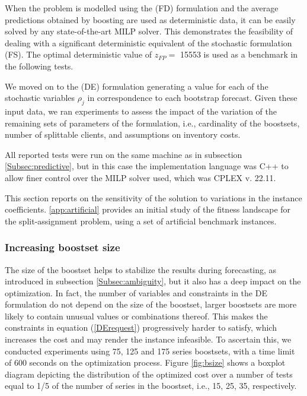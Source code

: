 \documentclass{itor}
\begin{document}
When the problem is modelled using the (FD) formulation and the average predictions obtained by boosting are used as deterministic data, it can be easily solved by any state-of-the-art MILP solver. This demonstrates the feasibility of dealing with a significant deterministic equivalent of the stochastic formulation (FS). The optimal deterministic value of $z_{FP} =$ 15553 is used as a benchmark in the following tests.

We moved on to the (DE) formulation generating a value for each of the stochastic variables $\rho_j$ in correspondence to each bootstrap forecast.
Given these input data, we ran experiments to assess the impact of the variation of the remaining sets of parameters of the formulation, i.e., cardinality of the boostsets, number of splittable clients, and assumptions on inventory costs. 

All reported tests were run on the same machine as in subsection \ref{Subsec:predictive}, but in this case the implementation language was C++ to allow finer control over the MILP solver used, which was CPLEX v. 22.11.

This section reports on the sensitivity of the solution to variations in the instance coefficients. \ref{app:artificial} provides an initial study of the fitness landscape for the split-assignment problem, using a set of artificial benchmark instances.

\subsubsection*{Increasing boostset size}

The size of the boostset helps to stabilize the results during forecasting, as introduced in subsection \ref{Subsec:ambiguity}, but it also has a deep impact on the optimization. In fact, the number of variables and constraints in the DE formulation do not depend on the size of the boostset, larger boostsets are more likely to contain unusual values or combinations thereof. This makes the constraints in equation (\ref{DErequest}) progressively harder to satisfy, which increases the cost and may render the instance infeasible.
To ascertain this, we conducted experiments using 75, 125 and 175 series boostsets, with a time limit of 600 seconds on the optimization process. Figure \ref{fig:bsize} shows a boxplot diagram depicting the distribution of the optimized cost over a number of tests equal to 1/5 of the number of series in the boostset, i.e., 15, 25, 35, respectively.
\end{document}
